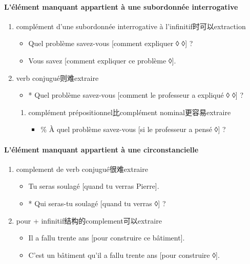 \documentclass[UTF8]{report}
\begin{document}
\paragraph{L’élément manquant appartient à une subordonnée interrogative}
\begin{enumerate}
    \item complément d’une subordonnée interrogative à l’infinitif时可以extraction
    \begin{itemize}
        \item Quel problème savez-vous [comment expliquer ◊ ◊] ?
        \item Vous savez [comment expliquer ce problème ◊].
    \end{itemize}
    \item verb conjugué则难extraire
    \begin{itemize}
        \item * Quel problème savez-vous [comment le professeur a expliqué ◊ ◊] ?
    \end{itemize}
    \begin{enumerate}
        \item complément prépositionnel比complément nominal更容易extraire
        \begin{itemize}
            \item \% À quel problème savez-vous [si le professeur a pensé ◊] ?
        \end{itemize}
    \end{enumerate}
\end{enumerate}
\paragraph{L’élément manquant appartient à une circonstancielle}
\begin{enumerate}
    \item complement de verb conjugué很难extraire
    \begin{itemize}
        \item Tu seras soulagé [quand tu verras Pierre].
        \item * Qui seras-tu soulagé [quand tu verras ◊] ?
    \end{itemize}
    \item pour + infinitif结构的complement可以extraire
    \begin{itemize}
        \item Il a fallu trente ans [pour construire ce bâtiment].
        \item C’est un bâtiment qu’il a fallu trente ans [pour construire ◊].
    \end{itemize}
\end{enumerate}
\end{document}
